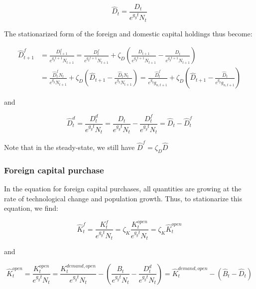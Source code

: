 \begin{equation}
  \hat{D}_{t} = \frac{D_{t}}{e^{g_{y}t}N_{t}}
\end{equation}

The stationarized form of the foreign and domestic capital holdings thus become:

\begin{equation}
  \begin{split}
    \hat{D}^{f}_{t+1} & = \frac{D^{f}_{t+1}}{e^{g_{y}t+1}N_{t+1}} = \frac{D^{f}_{t}}{e^{g_{y}t+1}N_{t+1}} + \zeta_{D}(\frac{D_{t+1}}{e^{g_{y}t+1}N_{t+1}} - \frac{D_{t}}{e^{g_{y}t+1}N_{t+1}}) \\
    & = \frac{\hat{D}^{f}_{t}N_{t}}{e^{g_{y}}N_{t+1}} + \zeta_{D}(\hat{D}_{t+1} - \frac{\hat{D}_{t}N_{t}}{e^{g_{y}}N_{t+1}}) = \frac{\hat{D}^{f}_{t}}{e^{g_{y}}g_{n,t+1}} + \zeta_{D}(\hat{D}_{t+1} - \frac{\hat{D}_{t}}{e^{g_{y}}g_{n,t+1}})
  \end{split}
\end{equation}

and

\begin{equation}
  \hat{D}^{d}_{t} = \frac{D^{d}_{t}}{e^{g_{y}t}N_{t}} = \frac{D_{t}}{e^{g_{y}t}N_{t}} - \frac{D^{f}_{t}}{e^{g_{y}t}N_{t}} = \hat{D}_{t} - \hat{D}^{f}_{t}
\end{equation}


Note that in the steady-state, we still have $\hat{D}^{f} = \zeta_{D}\hat{D}$


\subsubsection{Foreign capital purchase}

In the equation for foreign capital purchases, all quantities are growing at the rate of technological change and population growth.  Thus, to stationarize this equation, we find:

\begin{equation}
  \hat{K}^{f}_{t} = \frac{K^{f}_{t}}{e^{g_{y}t}N_{t}}= \zeta_{K}\frac{K^{open}_{t}}{e^{g_{y}t}N_{t}} = \zeta_{K}\hat{K}^{open}_{t}
\end{equation}

and

\begin{equation}
  \hat{K}^{open}_{t} = \frac{K^{open}_{t}}{e^{g_{y}t}N_{t}}= \frac{K^{demand, open}_{t}}{e^{g_{y}t}N_{t}} - \left(\frac{B_{t}}{e^{g_{y}t}N_{t}} - \frac{D^{d}_{t}}{e^{g_{y}t}N_{t}}\right) = \hat{K}^{demand, open}_{t} - (\hat{B}_{t}-\hat{D}_{t})
\end{equation}


